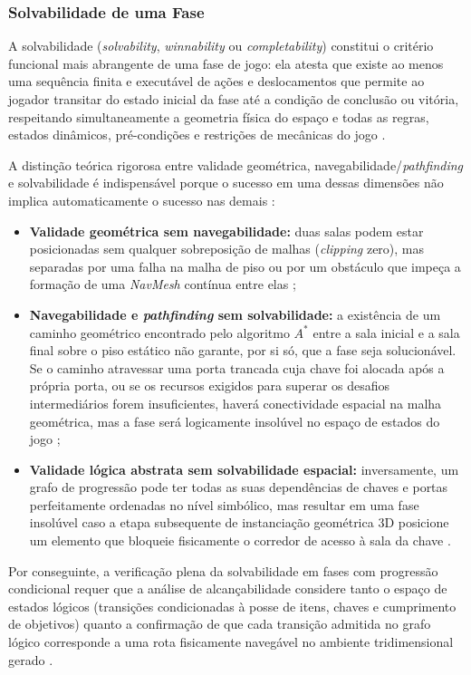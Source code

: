 \subsubsection{Solvabilidade de uma Fase}
\label{sec:solvabilidade}

A solvabilidade (\textit{solvability}, \textit{winnability} ou \textit{completability}) constitui o critério funcional mais abrangente de uma fase de jogo: ela atesta que existe ao menos uma sequência finita e executável de ações e deslocamentos que permite ao jogador transitar do estado inicial da fase até a condição de conclusão ou vitória, respeitando simultaneamente a geometria física do espaço e todas as regras, estados dinâmicos, pré-condições e restrições de mecânicas do jogo \cite{tanagra, linden2014dungeons, summerville2018procedural, nasir2024word2worldgeneratingstoriesworlds, xu2025constraint}.

A distinção teórica rigorosa entre validade geométrica, navegabilidade/\textit{pathfinding} e solvabilidade é indispensável porque o sucesso em uma dessas dimensões não implica automaticamente o sucesso nas demais \cite{dormans2010, linden2014dungeons, summerville2018procedural, xu2025constraint}:
\begin{itemize}
    \item \textbf{Validade geométrica sem navegabilidade:} duas salas podem estar posicionadas sem qualquer sobreposição de malhas (\textit{clipping} zero), mas separadas por uma falha na malha de piso ou por um obstáculo que impeça a formação de uma \textit{NavMesh} contínua entre elas \cite{sun2024roomplanner, xu2025databasedrivenframework3dlevel};
    \item \textbf{Navegabilidade e \textit{pathfinding} sem solvabilidade:} a existência de um caminho geométrico encontrado pelo algoritmo $A^*$ entre a sala inicial e a sala final sobre o piso estático não garante, por si só, que a fase seja solucionável. Se o caminho atravessar uma porta trancada cuja chave foi alocada após a própria porta, ou se os recursos exigidos para superar os desafios intermediários forem insuficientes, haverá conectividade espacial na malha geométrica, mas a fase será logicamente insolúvel no espaço de estados do jogo \cite{dormans2010, inproceedings, xu2025constraint};
    \item \textbf{Validade lógica abstrata sem solvabilidade espacial:} inversamente, um grafo de progressão pode ter todas as suas dependências de chaves e portas perfeitamente ordenadas no nível simbólico, mas resultar em uma fase insolúvel caso a etapa subsequente de instanciação geométrica 3D posicione um elemento que bloqueie fisicamente o corredor de acesso à sala da chave \cite{linden2014dungeons, xu2025databasedrivenframework3dlevel}.
\end{itemize}

Por conseguinte, a verificação plena da solvabilidade em fases com progressão condicional requer que a análise de alcançabilidade considere tanto o espaço de estados lógicos (transições condicionadas à posse de itens, chaves e cumprimento de objetivos) quanto a confirmação de que cada transição admitida no grafo lógico corresponde a uma rota fisicamente navegável no ambiente tridimensional gerado \cite{dormans2010, linden2014dungeons, xu2025constraint, xu2025databasedrivenframework3dlevel}.
